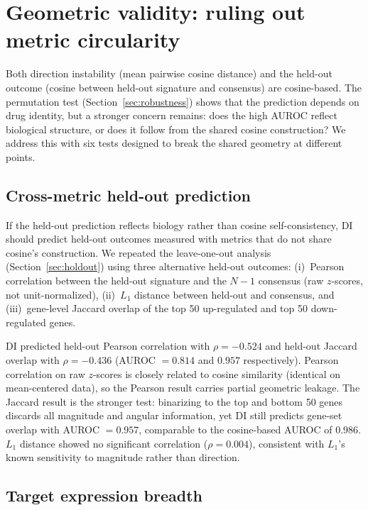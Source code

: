 \documentclass[11pt]{article}
\begin{document}
\section{Geometric validity: ruling out metric circularity}

Both direction instability (mean pairwise cosine distance) and the
held-out outcome (cosine between held-out signature and consensus) are
cosine-based.  The permutation test (Section~\ref{sec:robustness}) shows
that the prediction depends on drug identity, but a stronger concern
remains: does the high AUROC reflect biological structure, or does it
follow from the shared cosine construction?  We address this with six
tests designed to break the shared geometry at different points.

\subsection{Cross-metric held-out prediction}

If the held-out prediction reflects biology rather than cosine
self-consistency, DI should predict held-out outcomes measured with
metrics that do not share cosine's construction.  We repeated the
leave-one-out analysis (Section~\ref{sec:holdout}) using three
alternative held-out outcomes: (i)~Pearson correlation between the
held-out signature and the $N{-}1$ consensus (raw $z$-scores, not
unit-normalized), (ii)~$L_1$ distance between held-out and consensus,
and (iii)~gene-level Jaccard overlap of the top 50 up-regulated and top
50 down-regulated genes.

DI predicted held-out Pearson correlation with
$\rho = -0.524$ and held-out Jaccard overlap
with $\rho = -0.436$
(AUROC $= 0.814$ and
$0.957$ respectively).  Pearson correlation on raw $z$-scores is closely
related to cosine similarity (identical on mean-centered data), so the
Pearson result carries partial geometric leakage.  The Jaccard result is
the stronger test: binarizing to the top and bottom 50 genes discards all
magnitude and angular information, yet DI still predicts gene-set
overlap with AUROC $= 0.957$, comparable to the cosine-based AUROC of
0.986.  $L_1$ distance showed no significant correlation
($\rho = 0.004$), consistent with $L_1$'s known sensitivity to
magnitude rather than direction.

\subsection{Target expression breadth}
\end{document}
